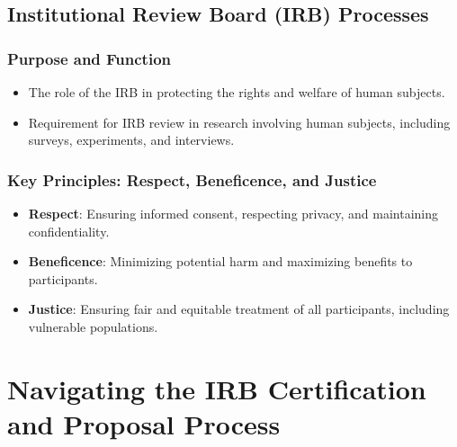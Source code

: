\documentclass[
]{book}
\begin{document}
\hypertarget{institutional-review-board-irb-processes}{%
\section*{Institutional Review Board (IRB) Processes}\label{institutional-review-board-irb-processes}}

\hypertarget{purpose-and-function}{%
\subsection*{Purpose and Function}\label{purpose-and-function}}

\begin{itemize}
\item
  The role of the IRB in protecting the rights and welfare of human subjects.
\item
  Requirement for IRB review in research involving human subjects, including surveys, experiments, and interviews.
\end{itemize}

\hypertarget{key-principles-respect-beneficence-and-justice}{%
\subsection*{Key Principles: Respect, Beneficence, and Justice}\label{key-principles-respect-beneficence-and-justice}}

\begin{itemize}
\item
  \textbf{Respect}: Ensuring informed consent, respecting privacy, and maintaining confidentiality.
\item
  \textbf{Beneficence}: Minimizing potential harm and maximizing benefits to participants.
\item
  \textbf{Justice}: Ensuring fair and equitable treatment of all participants, including vulnerable populations.
\end{itemize}

\hypertarget{navigating-the-irb-certification-and-proposal-process}{%
\chapter{Navigating the IRB Certification and Proposal Process}\label{navigating-the-irb-certification-and-proposal-process}}
\end{document}
